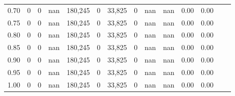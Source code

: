 \begin{tabular}{rrrrrrrrrrrrrr}
0.70 &        0 &       0 &     nan &  180,245 &        0 &  33,825 &       0 &   nan &   nan &  0.00 &      0.00 \\
0.75 &        0 &       0 &     nan &  180,245 &        0 &  33,825 &       0 &   nan &   nan &  0.00 &      0.00 \\
0.80 &        0 &       0 &     nan &  180,245 &        0 &  33,825 &       0 &   nan &   nan &  0.00 &      0.00 \\
0.85 &        0 &       0 &     nan &  180,245 &        0 &  33,825 &       0 &   nan &   nan &  0.00 &      0.00 \\
0.90 &        0 &       0 &     nan &  180,245 &        0 &  33,825 &       0 &   nan &   nan &  0.00 &      0.00 \\
0.95 &        0 &       0 &     nan &  180,245 &        0 &  33,825 &       0 &   nan &   nan &  0.00 &      0.00 \\
1.00 &        0 &       0 &     nan &  180,245 &        0 &  33,825 &       0 &   nan &   nan &  0.00 &      0.00 \\
\bottomrule
\end{tabular}
